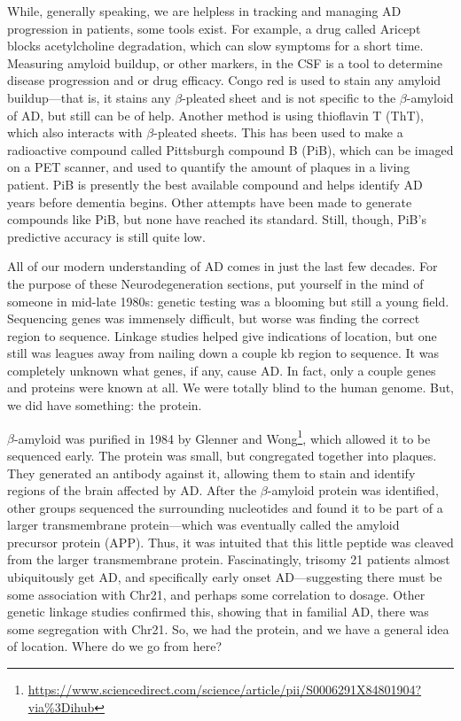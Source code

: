 While, generally speaking, we are helpless in tracking and managing AD progression in patients, some tools exist. For example, a drug called Aricept blocks acetylcholine degradation, which can slow symptoms for a short time. Measuring amyloid buildup, or other markers, in the CSF is a tool to determine disease progression and or drug efficacy. Congo red is used to stain any amyloid buildup---that is, it stains any $\beta$-pleated sheet and is not specific to the $\beta$-amyloid of AD, but still can be of help. Another method is using thioflavin T (ThT), which also interacts with $\beta$-pleated sheets. This has been used to make a radioactive compound called Pittsburgh compound B (PiB), which can be imaged on a PET scanner, and used to quantify the amount of plaques in a living patient. PiB is presently the best available compound and helps identify AD years before dementia begins. Other attempts have been made to generate compounds like PiB, but none have reached its standard. Still, though, PiB's predictive accuracy is still quite low.\newline

All of our modern understanding of AD comes in just the last few decades. For the purpose of these Neurodegeneration sections, put yourself in the mind of someone in mid-late 1980s: genetic testing was a blooming but still a young field. Sequencing genes was immensely difficult, but worse was finding the correct region to sequence. Linkage studies helped give indications of location, but one still was leagues away from nailing down a couple kb region to sequence. It was completely unknown what genes, if any, cause AD. In fact, only a couple genes and proteins were known at all. We were totally blind to the human genome. But, we did have something: the protein.\newline

$\beta$-amyloid was purified in 1984 by Glenner and Wong\footnote{\url{https://www.sciencedirect.com/science/article/pii/S0006291X84801904?via\%3Dihub}}, which allowed it to be sequenced early. The protein was small, but congregated together into plaques. They generated an antibody against it, allowing them to stain and identify regions of the brain affected by AD. After the $\beta$-amyloid protein was identified, other groups sequenced the surrounding nucleotides and found it to be part of a larger transmembrane protein---which was eventually called the amyloid precursor protein (APP). Thus, it was intuited that this little peptide was cleaved from the larger transmembrane protein. Fascinatingly, trisomy 21 patients almost ubiquitously get AD, and specifically early onset AD---suggesting there must be some association with Chr21, and perhaps some correlation to dosage. Other genetic linkage studies confirmed this, showing that in familial AD, there was some segregation with Chr21. So, we had the protein, and we have a general idea of location. Where do we go from here?

